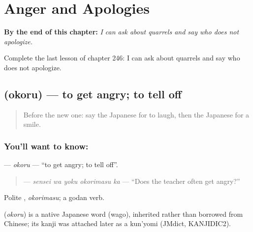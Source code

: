 
\chapter{Anger and Apologies}
\label{ch:ja-anger-and-apologies}

\begin{chapteropening}
\textbf{By the end of this chapter:} \emph{I can ask about quarrels and say who does not apologize.}

Complete the last lesson of chapter 246: I can ask about quarrels and say who does not apologize.
\end{chapteropening}

\section[\texorpdfstring{\ja{おこる} (okoru)}{おこる (okoru)}]{ (okoru) — to get angry; to tell off}

\label{lesson:JA-C246-okoru}



\begin{quote}
Before the new one: say the Japanese for to laugh, then the Japanese for a smile.
\end{quote}

\subsection*{You'll want to know: }
\textbf{} — \emph{okoru} — \textquotedblleft{}to get angry; to tell off\textquotedblright{}.

\begin{quote}
\textbf{  } — \emph{sensei wa yoku okorimasu ka} — \textquotedblleft{}Does the teacher often get angry?\textquotedblright{}
\end{quote}

Polite \textbf{}, \emph{okorimasu}; a godan verb.

\begin{cousinweb}
\textbf{} (\emph{okoru}) is a native Japanese word (wago), inherited rather than borrowed from Chinese; its kanji was attached later as a kun'yomi (JMdict, KANJIDIC2).
\end{cousinweb}

